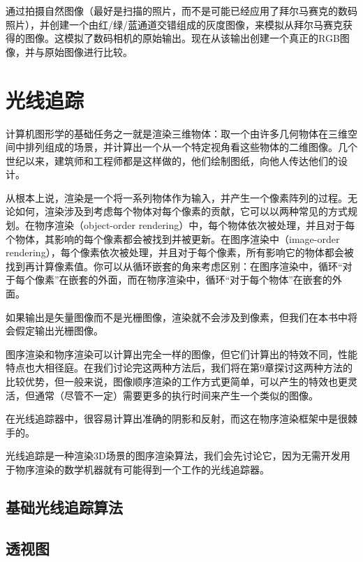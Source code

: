 \documentclass[lang=cn,12pt]{elegantbook}
\begin{document}
通过拍摄自然图像（最好是扫描的照片，而不是可能已经应用了拜尔马赛克的数码照片），并创建一个由红/绿/蓝通道交错组成的灰度图像，来模拟从拜尔马赛克获得的图像。这模拟了数码相机的原始输出。现在从该输出创建一个真正的RGB图像，并与原始图像进行比较。

\chapter{光线追踪}

计算机图形学的基础任务之一就是渲染三维物体：取一个由许多几何物体在三维空间中排列组成的场景，并计算出一个从一个特定视角看这些物体的二维图像。几个世纪以来，建筑师和工程师都是这样做的，他们绘制图纸，向他人传达他们的设计。

从根本上说，渲染是一个将一系列物体作为输入，并产生一个像素阵列的过程。无论如何，渲染涉及到考虑每个物体对每个像素的贡献，它可以以两种常见的方式规划。在物序渲染（object-order rendering）中，每个物体依次被处理，并且对于每个物体，其影响的每个像素都会被找到并被更新。在图序渲染中（image-order rendering），每个像素依次被处理，并且对于每个像素，所有影响它的物体都会被找到再计算像素值。你可以从循环嵌套的角来考虑区别：在图序渲染中，循环“对于每个像素”在嵌套的外面，而在物序渲染中，循环“对于每个物体”在嵌套的外面。

\begin{note}
  如果输出是矢量图像而不是光栅图像，渲染就不会涉及到像素，但我们在本书中将会假定输出光栅图像。
\end{note}

图序渲染和物序渲染可以计算出完全一样的图像，但它们计算出的特效不同，性能特点也大相径庭。在我们讨论完这两种方法后，我们将在第9章探讨这两种方法的比较优势，但一般来说，图像顺序渲染的工作方式更简单，可以产生的特效也更灵活，但通常（尽管不一定）需要更多的执行时间来产生一个类似的图像。

\begin{note}
  在光线追踪器中，很容易计算出准确的阴影和反射，而这在物序渲染框架中是很棘手的。
\end{note}

光线追踪是一种渲染3D场景的图序渲染算法，我们会先讨论它，因为无需开发用于物序渲染的数学机器就有可能得到一个工作的光线追踪器。

\section{基础光线追踪算法}



\section{透视图}
\end{document}
